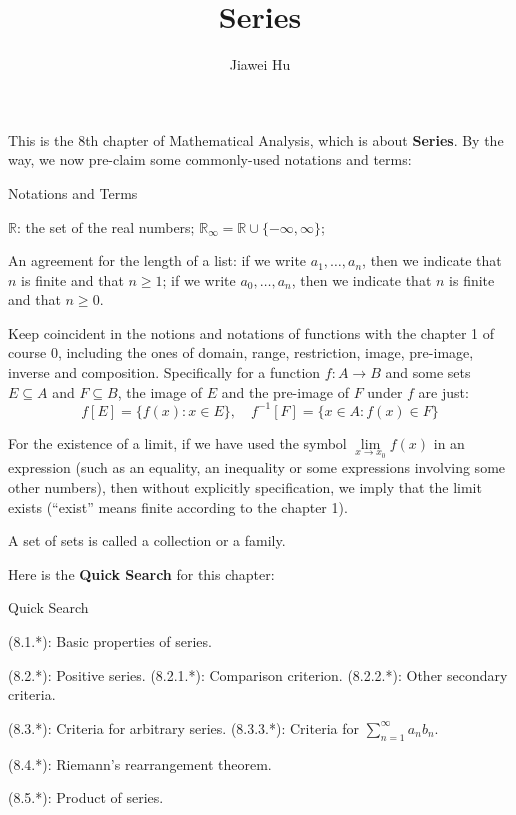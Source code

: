 \documentclass{article}
\title{\LARGE \textbf{Series}}
\author{\large Jiawei Hu}
\begin{document}
\maketitle

This is the 8th chapter of Mathematical Analysis, which is about \textbf{Series}. By the way, we now pre-claim some commonly-used notations and terms:
\begin{Df}{Notations and Terms}
    \begin{compactenum}
        \item $\mathbb{R}$: the set of the real numbers; $\mathbb{R}_\infty = \mathbb{R}\cup\{-\infty, \infty\}$;
        \item An agreement for the length of a list: if we write $a_1, \dots, a_n$, then we indicate that $n$ is finite and that $n\geq 1$; if we write $a_0, \dots, a_n$, then we indicate that $n$ is finite and that $n\geq 0$.
        \item Keep coincident in the notions and notations of functions with the chapter 1 of course 0, including the ones of domain, range, restriction, image, pre-image, inverse and composition. Specifically for a function $f: A\rightarrow B$ and some sets $E\subseteq A$ and $F\subseteq B$, the image of $E$ and the pre-image of $F$ under $f$ are just:
        $$f[E] = \{f(x): x\in E\},\quad f^{-1}[F] = \{x\in A: f(x)\in F\}$$
        \item For the existence of a limit, if we have used the symbol $\lim\limits_{x\to x_0} f(x)$ in an expression (such as an equality, an inequality or some expressions involving some other numbers), then without explicitly specification, we imply that the limit exists (``exist'' means finite according to the chapter 1).
        \item A set of sets is called a collection or a family.
    \end{compactenum}
\end{Df}

Here is the \textbf{Quick Search} for this chapter:
\begin{Th}{Quick Search}
    \begin{compactdesc}
        \item (8.1.*): Basic properties of series.
        \item (8.2.*): Positive series.
            \subitem (8.2.1.*): Comparison criterion.
            \subitem (8.2.2.*): Other secondary criteria.
        \item (8.3.*): Criteria for arbitrary series.
            \subitem (8.3.3.*): Criteria for $ \sum_{n=1}^{\infty} a_n b_n $.
        \item (8.4.*): Riemann's rearrangement theorem.
        \item (8.5.*): Product of series.
    \end{compactdesc}
\end{Th}
\end{document}

